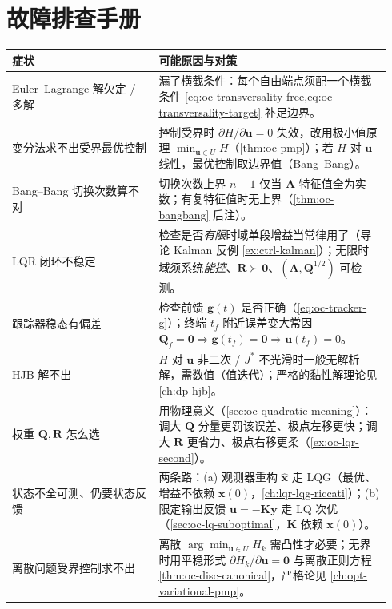 \section*{故障排查手册}
\begin{table}[H]\centering\small
\begin{tabular}{p{0.36\linewidth}p{0.58\linewidth}}
\toprule
症状 & 可能原因与对策 \\
\midrule
Euler--Lagrange 解欠定 / 多解 & 漏了横截条件：每个自由端点须配一个横截条件 \cref{eq:oc-transversality-free,eq:oc-transversality-target} 补足边界。 \\
变分法求不出受界最优控制 & 控制受界时 $\partial H/\partial\mathbf u=0$ 失效，改用极小值原理 $\min_{\mathbf u\in U}H$（\cref{thm:oc-pmp}）；若 $H$ 对 $\mathbf u$ 线性，最优控制取边界值（Bang--Bang）。 \\
Bang--Bang 切换次数算不对 & 切换次数上界 $n-1$ 仅当 $\mathbf A$ 特征值全为实数；有复特征值时无上界（\cref{thm:oc-bangbang} 后注）。 \\
LQR 闭环不稳定 & 检查是否\emph{有限}时域单段增益当常律用了（导论 Kalman 反例 \cref{ex:ctrl-kalman}）；无限时域须系统\emph{能控}、$\mathbf R\succ\mathbf0$、$(\mathbf A,\mathbf Q^{1/2})$ 可检测。 \\
跟踪器稳态有偏差 & 检查前馈 $\mathbf g(t)$ 是否正确（\cref{eq:oc-tracker-g}）；终端 $t_f$ 附近误差变大常因 $\mathbf Q_f=\mathbf0\Rightarrow\mathbf g(t_f)=\mathbf0\Rightarrow\mathbf u(t_f)=0$。 \\
HJB 解不出 & $H$ 对 $\mathbf u$ 非二次 / $J^*$ 不光滑时一般无解析解，需数值（值迭代）；严格的黏性解理论见 \cref{ch:dp-hjb}。 \\
权重 $\mathbf Q,\mathbf R$ 怎么选 & 用物理意义（\cref{sec:oc-quadratic-meaning}）：调大 $\mathbf Q$ 分量更罚该误差、极点左移更快；调大 $\mathbf R$ 更省力、极点右移更柔（\cref{ex:oc-lqr-second}）。 \\
状态不全可测、仍要状态反馈 & 两条路：(a) 观测器重构 $\hat{\mathbf x}$ 走 LQG（最优、增益不依赖 $\mathbf x(0)$，\cref{ch:lqr-lqg-riccati}）；(b) 限定输出反馈 $\mathbf u=-\mathbf K\mathbf y$ 走 LQ 次优（\cref{sec:oc-lq-suboptimal}，$\mathbf K$ 依赖 $\mathbf x(0)$）。 \\
离散问题受界控制求不出 & 离散 $\arg\min_{\mathbf u\in U}H_k$ 需凸性才必要；无界时用平稳形式 $\partial H_k/\partial\mathbf u=\mathbf0$ 与离散正则方程 \cref{thm:oc-disc-canonical}，严格论见 \cref{ch:opt-variational-pmp}。 \\
\bottomrule
\end{tabular}
\end{table}
